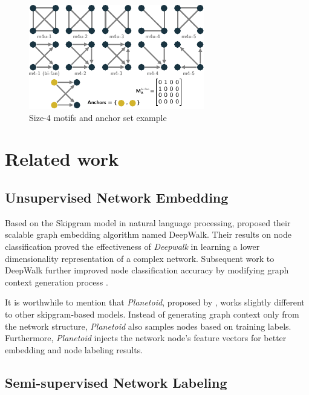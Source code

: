 \documentclass{article}
\theoremstyle{definition}
\begin{document}
\begin{figure} \label{fig:m4}
    \centering
    \includegraphics[width=0.9\linewidth]{m4}
    \caption{Size-4 motifs and anchor set example}
\end{figure}


\section{Related work}

\subsection{Unsupervised Network Embedding}

Based on the Skipgram model \cite{skipgram} in natural language 
processing, \citeauthor{deepwalk} proposed their scalable graph embedding 
algorithm named DeepWalk. Their results on node classification proved the 
effectiveness of \emph{Deepwalk} in learning a lower dimensionality 
representation of a complex network. Subsequent  work to DeepWalk further 
improved node classification accuracy by modifying graph context 
generation process \cite{line,grarep,planetoid,node2vec}. 

It is worthwhile to mention that \emph{Planetoid}, proposed by 
\citeauthor{planetoid}, works slightly different to other skipgram-based 
models. Instead of generating graph context only from the network 
structure, \emph{Planetoid} also samples nodes based on training labels. 
Furthermore, \emph{Planetoid} injects the network
node's feature vectors for better embedding and node labeling results.

\subsection{Semi-supervised Network Labeling}
\end{document}
